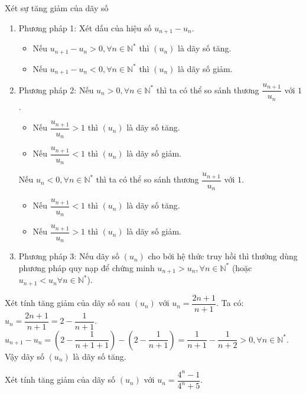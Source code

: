 \begin{dang}{Xét sự tăng giảm của dãy số}
	\begin{enumerate}
		\item Phương pháp 1: Xét dấu của hiệu số $u_{n+1}-u_n$.
		\begin{itemize}
			\item Nếu $u_{n+1}-u_n>0, \forall n \in \mathbb{N}^*$ thì $(u_n)$ là dãy số tăng.
			\item Nếu $u_{n+1}-u_n<0, \forall n \in \mathbb{N}^*$ thì $(u_n)$ là dãy số giảm.
		\end{itemize}
		\item Phương pháp 2: Nếu $u_n>0, \forall n\in \mathbb{N}^*$ thì ta có thể so sánh thương $\dfrac{u_{n+1}}{u_n}$ với $1$.
		\begin{itemize}
			\item Nếu $\dfrac{u_{n+1}}{u_n}>1$ thì $(u_n)$ là dãy số tăng.
			\item Nếu $\dfrac{u_{n+1}}{u_n}<1$ thì $(u_n)$ là dãy số giảm.
		\end{itemize}
		Nếu $u_n<0, \forall n\in \mathbb{N}^*$ thì ta có thể so sánh thương $\dfrac{u_{n+1}}{u_n}$ với $1$.
		\begin{itemize}
			\item Nếu $\dfrac{u_{n+1}}{u_n}<1$ thì $(u_n)$ là dãy số tăng.
			\item Nếu $\dfrac{u_{n+1}}{u_n}>1$ thì $(u_n)$ là dãy số giảm.
		\end{itemize}
		\item Phương pháp 3: Nếu dãy số $(u_n)$ cho bởi hệ thức truy hồi thì thường dùng phương pháp quy nạp để chứng minh $u_{n+1}>u_n, \forall n \in \mathbb{N}^*$ (hoặc $u_{n+1}<u_n \forall n \in \mathbb{N}^*$).
	\end{enumerate}
\end{dang}
\setcounter{vd}{0}
\setcounter{bt}{0}
\begin{vd}%
	Xét tính tăng giảm của dãy số sau $(u_n)$ với $u_n=\dfrac{2n+1}{n+1}$.
	\loigiai
	{
		Ta có: $u_n=\dfrac{2n+1}{n+1}=2-\dfrac{1}{n+1}$.\\
		$u_{n+1}-u_n=\left(2-\dfrac{1}{n+1+1}\right)-\left(2-\dfrac{1}{n+1}\right)=\dfrac{1}{n+1}-\dfrac{1}{n+2}>0, \forall n \in \mathbb{N}^*$.\\
		Vậy dãy số $(u_n)$ là dãy số tăng.
	}
\end{vd}
\begin{vd}
	Xét tính tăng giảm của dãy số $(u_n)$ với $u_n=\dfrac{4^n-1}{4^n+5}$.
\end{vd}
